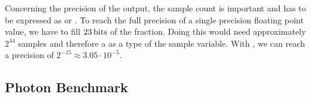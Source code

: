 \documentclass{stdlocal}
\begin{document}
    Concerning the precision of the output, the sample count is important and has to be expressed as  or .
    To reach the full precision of a single precision floating point value, we have to fill $23\, \mathrm{bits}$ of the fraction.
    Doing this would need approximately $2^{44}$ samples and therefore a  as a type of the sample variable.
    With , we can reach a precision of $2^{-15} \approx 3.05\cdot 10^{-5}$.

  \subsection{Photon Benchmark} %
  \label{sub:photon_benchmark}

\end{document}
